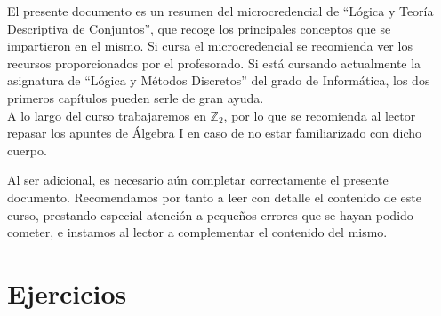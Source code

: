 \documentclass[12pt]{book}
\begin{document}

    

    \newpage


    El presente documento es un resumen del microcredencial de ``Lógica y Teoría Descriptiva de Conjuntos'', que recoge los principales conceptos que se impartieron en el mismo. Si cursa el microcredencial se recomienda ver los recursos proporcionados por el profesorado. Si está cursando actualmente la asignatura de ``Lógica y Métodos Discretos'' del grado de Informática, los dos primeros capítulos pueden serle de gran ayuda.\\

    A lo largo del curso trabajaremos en $\mathbb{Z}_2$, por lo que se recomienda al lector repasar los apuntes de Álgebra I en caso de no estar familiarizado con dicho cuerpo.~\\

    \begin{observacion}
        Al ser adicional, es necesario aún completar correctamente el presente documento. Recomendamos por tanto a leer con detalle el contenido de este curso, prestando especial atención a pequeños errores que se hayan podido cometer, e instamos al lector a complementar el contenido del mismo.
    \end{observacion}



    
    
    

    \chapter{Ejercicios}
    
    
    
\end{document}
